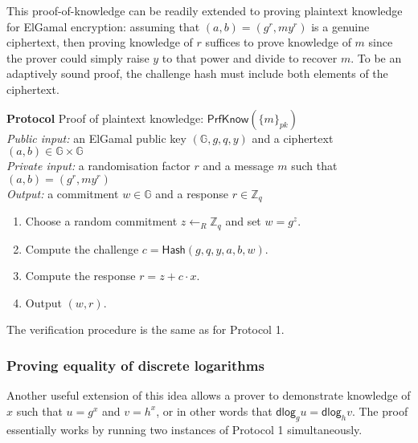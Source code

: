 \documentclass[12pt,a4paper]{article}
\makeatletter
\newcommand{\dlog}{\mathsf{dlog}}
\theoremstyle{definition}
\newcounter{protocol}
\newenvironment{protocol}[1]
  {\par\addvspace{\topsep}
   \noindent
   \tabularx{\linewidth}{@{} X @{}}
    \refstepcounter{protocol}\textbf{Protocol \theprotocol} #1 \\
    \hline}
  {
    \endtabularx
   }
\makeatother
\begin{document}
This proof-of-knowledge can be readily extended to proving plaintext knowledge for ElGamal encryption: assuming that $(a, b) = (g^r, my^r)$ is a genuine ciphertext, then proving knowledge of $r$ suffices to prove knowledge of $m$ since the prover could simply raise $y$ to that power and divide to recover $m$. To be an adaptively sound proof, the challenge hash must include both elements of the ciphertext.

\begin{protocol}{Proof of plaintext knowledge: $\mathsf{PrfKnow}(\{m\}_{pk})$}\label{prot:ProofKnowPlaintext}
    \textit{Public input:} an ElGamal public key $(\mathbb{G}, g, q, y)$ and a ciphertext $(a, b)\in\mathbb{G}\times\mathbb{G}$\\
    \textit{Private input:} a randomisation factor $r$ and a message $m$ such that $(a, b) = (g^r, my^r)$\\
    \textit{Output:} a commitment $w\in\mathbb{G}$ and a response $r\in\mathbb{Z}_q$
    \begin{enumerate}
        \item Choose a random commitment $z\leftarrow_R\mathbb{Z}_q$ and set $w = g^z$.
        \item Compute the challenge $c=\mathsf{Hash}(g, q, y, a, b, w)$.
        \item Compute the response $r=z+c\cdot x$.
        \item Output $(w, r)$.
    \end{enumerate}
\end{protocol}
The verification procedure is the same as for Protocol 1.

\subsubsection{Proving equality of discrete logarithms}
Another useful extension of this idea allows a prover to demonstrate knowledge of $x$ such that $u=g^x$ and $v=h^x$, or in other words that $\dlog_g u=\dlog_h v$. The proof essentially works by running two instances of Protocol 1 simultaneously.
\end{document}
